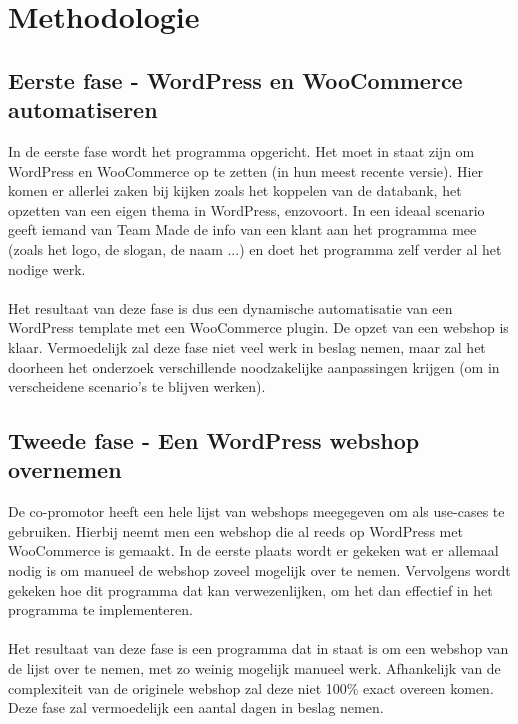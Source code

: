 \section{Methodologie}%
\label{sec:methodologie}

\subsection{Eerste fase - WordPress en WooCommerce automatiseren}

In de eerste fase wordt het programma opgericht. Het moet in staat zijn om WordPress en WooCommerce op te zetten (in hun meest recente versie). Hier komen er allerlei zaken bij kijken zoals het koppelen van de databank, het opzetten van een eigen thema in WordPress, enzovoort. In een ideaal scenario geeft iemand van Team Made de info van een klant aan het programma mee (zoals het logo, de slogan, de naam ...) en doet het programma zelf verder al het nodige werk. 
\\\\
Het resultaat van deze fase is dus een dynamische automatisatie van een WordPress template met een WooCommerce plugin. De opzet van een webshop is klaar. Vermoedelijk zal deze fase niet veel werk in beslag nemen, maar zal het doorheen het onderzoek verschillende noodzakelijke aanpassingen krijgen (om in verscheidene scenario's te blijven werken). 

\subsection{Tweede fase - Een WordPress webshop overnemen}

De co-promotor heeft een hele lijst van webshops meegegeven om als use-cases te gebruiken. Hierbij neemt men een webshop die al reeds op WordPress met WooCommerce is gemaakt. In de eerste plaats wordt er gekeken wat er allemaal nodig is om manueel de webshop zoveel mogelijk over te nemen. Vervolgens wordt gekeken hoe dit programma dat kan verwezenlijken, om het dan effectief in het programma te implementeren. 
\\\\
Het resultaat van deze fase is een programma dat in staat is om een webshop van de lijst over te nemen, met zo weinig mogelijk manueel werk. Afhankelijk van de complexiteit van de originele webshop zal deze niet 100\% exact overeen komen. Deze fase zal vermoedelijk een aantal dagen in beslag nemen.

